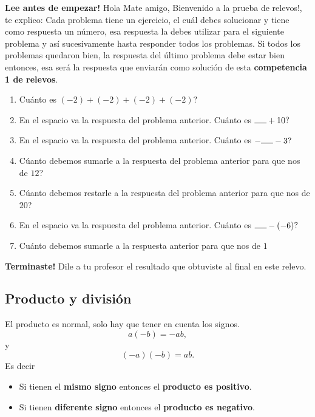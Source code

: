 \textbf{Lee antes de empezar! } Hola Mate amigo, Bienvenido a la prueba de relevos!, te explico: Cada problema tiene un ejercicio, el cuál debes solucionar y tiene como respuesta un número, esa respuesta la debes utilizar para el siguiente problema y así sucesivamente hasta responder todos los problemas. Si todos los problemas quedaron bien, la respuesta del último problema debe estar bien entonces, esa será la respuesta que enviarán como solución de esta \textbf{competencia 1 de relevos}.
\vspace{1cm}
\begin{enumerate}
	\item Cuánto es $(-2)+(-2)+(-2)+(-2)$?
	
	\item En el espacio va la respuesta del problema anterior. Cuánto es $\rule{5mm}{0.15mm} + 10?$
	
	\item En el espacio va la respuesta del problema anterior. Cuánto es $-\rule{5mm}{0.15mm} - 3?$
	
	\item Cúanto debemos sumarle a la respuesta del problema anterior para que nos de $12$?
	
	\item Cúanto debemos restarle a la respuesta del problema anterior para que nos de $20$?
	
	\item En el espacio va la respuesta del problema anterior. Cuánto es $\rule{5mm}{0.15mm} - (-6)?$
	
	\item Cuánto debemos sumarle a la respuesta anterior para que nos de $1$
	
\end{enumerate}

\textbf{Terminaste! } Dile a tu profesor el resultado que obtuviste al final en este relevo.
\newpage


\subsection{Producto y división}\label{subsubsubsection_producto_numeros_reales}

El producto es normal, solo hay que tener en cuenta los signos.
\[
		a(-b) = -ab,
\]
y
\[
		(-a)(-b)=ab.
\]
Es decir
\begin{itemize}
		\item Si tienen el \textbf{mismo signo} entonces el \textbf{producto es positivo}.
		\item Si tienen \textbf{diferente signo} entonces el \textbf{producto es negativo}. 
\end{itemize}

